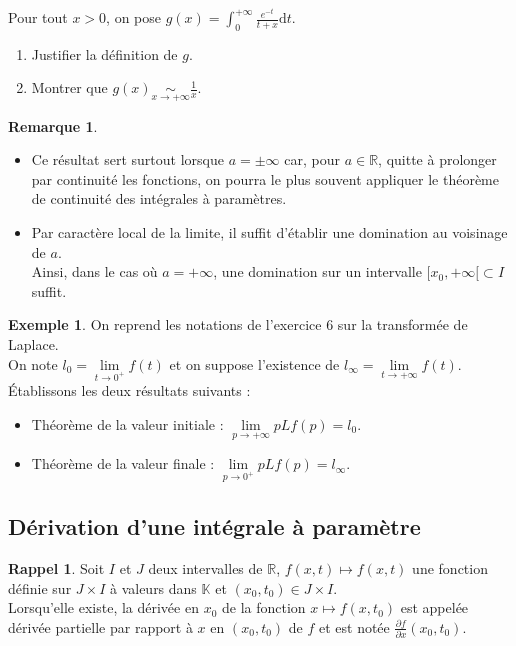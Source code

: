 \documentclass[french]{article}
\newcommand{\R}{\mathbb{R}}
\newcommand{\K}{\mathbb{K}}
\renewcommand{\d}{\text{d}}
\theoremstyle{plain}
\theoremstyle{definition}
\newtheorem*{ex}{Exemple}
\newtheorem*{rmq}{Remarque}
\newtheorem*{rappel}{Rappel}
\theoremstyle{remark}
\begin{document}
\begin{exo}
	Pour tout $x>0$, on pose $g(x)=\displaystyle\int_{0}^{+\infty}\frac{e^{-t}}{t+x}\d t$.
	\begin{enumerate}
		\item Justifier la définition de $g$.
		\item Montrer que $\displaystyle g(x)\underset{x\to +\infty}{\sim}\frac{1}{x}$.
	\end{enumerate}
\end{exo}

\begin{rmq}
	\begin{itemize}
		\item Ce résultat sert surtout lorsque $a=\pm\infty$ car, pour $a\in\R$, quitte à prolonger par continuité les fonctions, on pourra le plus souvent appliquer le théorème de continuité des intégrales à paramètres.
		\item Par caractère local de la limite, il suffit d'établir une domination au voisinage de $a$. \\ Ainsi, dans le cas où $a=+\infty$, une domination sur un intervalle $[x_0,+\infty[\subset I$ suffit.
	\end{itemize}
\end{rmq}

\begin{ex}
	On reprend les notations de l'exercice $6$ sur la transformée de Laplace.\\
	On note $l_0=\underset{t\to 0^+}{\lim}f(t)$ et on suppose l'existence de $l_\infty=\underset{t\to +\infty}{\lim}f(t)$. Établissons les deux résultats suivants :
	\begin{itemize}
		\item Théorème de la valeur initiale : $\underset{p\to+\infty}{\lim}pLf(p)=l_0$.
		\item Théorème de la valeur finale : $\underset{p\to0^+}{\lim}pLf(p)=l_\infty$.
	\end{itemize}
\end{ex}

\subsection{Dérivation d'une intégrale à paramètre}

\begin{rappel}
	Soit $I$ et $J$ deux intervalles de $\R$, $f(x,t)\mapsto f(x,t)$ une fonction définie sur $J\times I$ à valeurs dans $\K$ et $(x_0,t_0)\in J\times I$.\\
	Lorsqu'elle existe, la dérivée en $x_0$ de la fonction $x\mapsto f(x,t_0)$ est appelée dérivée partielle par rapport à $x$ en $(x_0,t_0)$ de $f$ et est notée $\displaystyle\frac{\partial f}{\partial x}(x_0,t_0)$.
\end{rappel}
\end{document}
